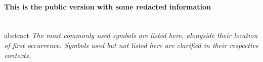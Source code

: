 \paragraph{This is the public version with some redacted information}\hrulefill\\
\fi
{abstract}%
\tableofcontents%
\textit{The most commonly used symbols are listed here, alongside their location of first occurrence. Symbols used but not listed here are clarified in their respective contexts.}
\printunsrtglossary[type = symbols, style = symbunitlong]
\printunsrtglossary[type = subsuper, style = mcolalttreegroup, nonumberlist]
\printunsrtglossary[type = abbreviations, style = myacr]
%
\listoffigures%
\listoftables%
%
\lstlistoflistings%
\cleardoubleoddpage%
%
